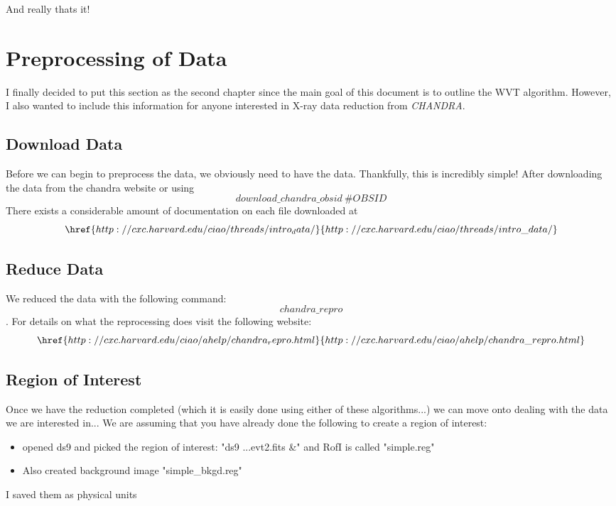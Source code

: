 \documentclass[11pt,letterpaper]{article}
\begin{document}
And really thats it!

\newpage


\section{Preprocessing of Data}
I finally decided to put this section as the second chapter since the main goal of this document is to outline the WVT algorithm. However, I also wanted to include this information for anyone interested in X-ray data reduction from \textit{CHANDRA}.

\subsection{Download Data}
Before we can begin to preprocess the data, we obviously need to have the data. Thankfully, this is incredibly simple! After downloading the data from the chandra website or using $$download\_chandra\_obsid \ \#OBSID $$ 
There exists a considerable amount of documentation on each file downloaded at 
$$\href{http://cxc.harvard.edu/ciao/threads/intro_data/}{http://cxc.harvard.edu/ciao/threads/intro\_data/} $$
\subsection{Reduce Data}
We reduced the data with the following command: $$chandra\_repro $$. For details on what the reprocessing does visit the following website:
$$\href{http://cxc.harvard.edu/ciao/ahelp/chandra_repro.html}{http://cxc.harvard.edu/ciao/ahelp/chandra\_repro.html}$$



\subsection{Region of Interest}
Once we have the reduction completed (which it is easily done using either of these algorithms...) we can move onto dealing with the data we are interested in...
We are assuming that you have already done the following  to create a region of interest:
\begin{itemize}
	\item opened ds9 and picked the region of interest: "ds9 ...evt2.fits \&" and RofI is called "simple.reg"
	\item Also created background image "simple\_bkgd.reg"
\end{itemize}

I saved them as physical units
\end{document}
